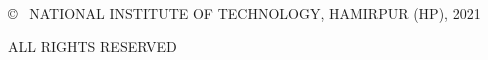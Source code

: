 ~
\doublespacing
\vspace{8cm}

\begin{center}
	\copyright~ NATIONAL INSTITUTE OF TECHNOLOGY, HAMIRPUR (HP), 2021

ALL RIGHTS RESERVED
\end{center}
 ~ 